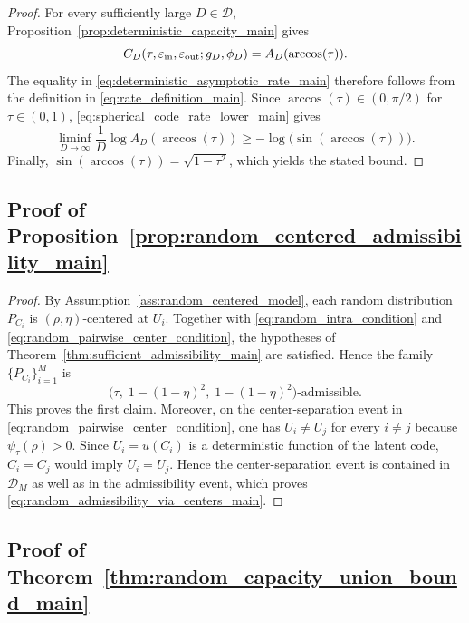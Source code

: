 \documentclass[journal]{IEEEtran}
\begin{document}
\begin{bibunit}
\begin{proof}
%
For every sufficiently large $D\in\mathcal D$, Proposition~\ref{prop:deterministic_capacity_main} gives
\[
C_D(\tau,\varepsilon_{\rm in},\varepsilon_{\rm out};g_D,\phi_D) = A_D(\arccos(\tau)).
\]
The equality in \eqref{eq:deterministic_asymptotic_rate_main} therefore follows from the definition in \eqref{eq:rate_definition_main}. Since $\arccos(\tau)\in(0,\pi/2)$ for $\tau\in(0,1)$, \eqref{eq:spherical_code_rate_lower_main} gives
\[
\liminf_{D\to\infty} \frac{1}{D}\log A_D(\arccos(\tau))
\ge -\log \bigl(\sin(\arccos(\tau))\bigr).
\]
Finally, $\sin(\arccos(\tau))=\sqrt{1-\tau^2}$, which yields the stated bound.
%
\end{proof}





\subsection{Proof of Proposition~\ref{prop:random_centered_admissibility_main}}
\label{app:proof_prop_random_centered_admissibility}

\begin{proof}
%
By Assumption~\ref{ass:random_centered_model}, each random distribution $P_{C_i}$ is $(\rho,\eta)$-centered at $U_i$. Together with \eqref{eq:random_intra_condition} and \eqref{eq:random_pairwise_center_condition}, the hypotheses of Theorem~\ref{thm:sufficient_admissibility_main} are satisfied. Hence the family $\{P_{C_i}\}_{i=1}^M$ is
\[
\bigl(\tau,\;1-(1-\eta)^2,\;1-(1-\eta)^2\bigr)\text{-admissible}.
\]
This proves the first claim. Moreover, on the center-separation event in \eqref{eq:random_pairwise_center_condition}, one has $U_i\ne U_j$ for every $i\ne j$ because $\psi_\tau(\rho)>0$. Since $U_i=u(C_i)$ is a deterministic function of the latent code, $C_i=C_j$ would imply $U_i=U_j$. Hence the center-separation event is contained in $\mathcal D_M$ as well as in the admissibility event, which proves \eqref{eq:random_admissibility_via_centers_main}.
%
\end{proof}




 

\subsection{Proof of Theorem~\ref{thm:random_capacity_union_bound_main}}
\label{app:proof_thm_random_capacity_union_bound}


\end{bibunit}
\end{document}
